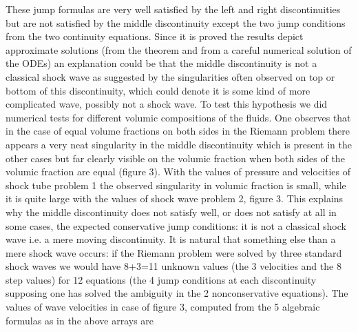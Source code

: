 \documentclass[a4paper,12pt]{article}
\begin{document}
 These jump formulas  are very well satisfied by the left and right discontinuities but are not  satisfied by the middle discontinuity except the two jump conditions from the two continuity equations. Since it is proved the results depict approximate solutions (from the theorem and from a careful numerical solution of the ODEs) an explanation could be that the middle discontinuity is not a classical shock wave as suggested by the   singularities  often observed on top or bottom of this discontinuity,  which could denote it is some kind of  more complicated wave, possibly not a  shock wave. To test this hypothesis we did numerical tests for different  volumic compositions of the fluids. One observes that in the case of equal volume fractions on both sides in the Riemann problem there appears a very neat singularity in the middle discontinuity which is present in the other cases but far clearly visible on the volumic fraction  when both sides of the volumic fraction are equal (figure 3). With the values of pressure and velocities of shock tube problem 1 the observed singularity in volumic fraction is small, while it is quite large with the values of shock wave problem 2, figure 3. This explains why the middle discontinuity does not satisfy well, or does not satisfy at all  in some cases, the expected conservative jump conditions: it is not a classical shock wave i.e. a mere moving discontinuity. It is natural that something else than a mere shock wave occurs: if the Riemann problem were solved by three standard shock waves we would have 8+3=11 unknown values (the 3 velocities and the 8 step values) for 12 equations (the 4 jump conditions at each discontinuity supposing one has solved the ambiguity in the 2 nonconservative equations).  The values of wave velocities in case of figure 3, computed from the 5 algebraic formulas as in the above arrays  are
\end{document}
